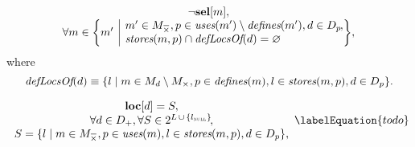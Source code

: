 \begin{equation}
  \begin{array}{c}
    \neg\mVar{sel}[m], \\
    \forall m \in
      \mSetBuilder*{m'}%
                   {%
                     \begin{array}{@{}l@{}}
                       m' \in \mKillMatchCompSet,
                       p \in \mUses(m') \setminus \mDefines(m'),
                       d \in \mDataSet[p] \hspace{-1pt}, \\
                       \mStores(m, p) \cap \mDefLocsOf(d) = \mEmptySet
                     \end{array}
                   } \!,
  \end{array}
\end{equation}
%
where
%
\begin{equation}
  \mDefLocsOf(d)
  \equiv
  \mSetBuilder{l}%
              {%
                m \in \mMatchSet[d] \setminus \mKillMatchSet,
                p \in \mDefines(m),
                l \in \mStores(m, p),
                d \in \mDataSet[p]
              }.
\end{equation}



\begin{equation}
  \begin{array}{c}
    \mVar{loc}[d] = S, \\
    \forall d \in \mDataUsedOnceSet,
    \forall S \in
      \mPowerset{\mLocationSet \, \cup \, \mSet{\mNullLocation}} \!, \\
    S = \mSetBuilder{l}%
                    {%
                      m \in \mKillMatchCompSet,
                      p \in \mUses(m),
                      l \in \mStores(m, p),
                      d \in \mDataSet[p]
                    },
  \end{array}
  \labelEquation{todo}
\end{equation}



